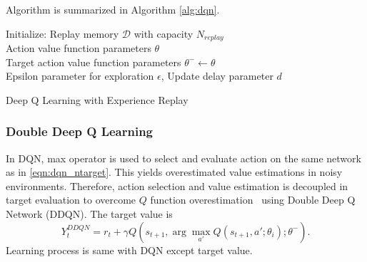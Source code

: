 Algorithm is summarized in Algorithm \ref{alg:dqn}. 
\begin{algorithm}
	\SetAlgoLined
	\DontPrintSemicolon %
	Initialize: Replay memory $\mathcal{D}$ with capacity $N_{replay}$ \\
	Action value function parameters $\theta$ \\
	Target action value function parameters $\theta^- \leftarrow \theta$ \\
	Epsilon parameter for exploration $\epsilon$, Update delay parameter $d$ \\
	\caption{Deep Q Learning with Experience Replay}
	\label{alg:dqn}
\end{algorithm}

\subsubsection{Double Deep Q Learning}
In DQN, max operator is used to select and evaluate action on the same network as in \eqref{eqn:dqn_ntarget}. 
This yields overestimated value estimations in noisy environments. 
Therefore, action selection and value estimation is decoupled in target evaluation 
to overcome $Q$ function overestimation~\cite{van_hasselt_deep_2015} using Double Deep Q Network (DDQN). The target value is
\begin{equation}
\label{eqn:ddqn_ntarget}
Y_t^{DDQN} = r_t + \gamma Q(s_{t+1}, \arg\max_{a'} Q(s_{t+1}, a'; \theta_i );\theta^-).
\end{equation}
Learning process is same with DQN except target value. 

